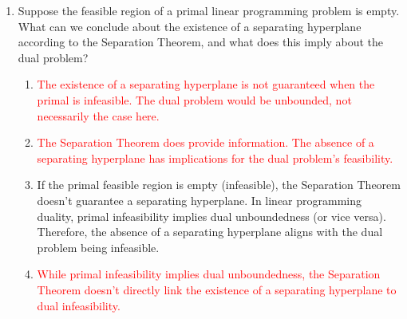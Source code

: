 \documentclass{article}%
\newcommand{\incorrect}[1]{\textcolor{red}{#1}}
\begin{document}
\begin{enumerate}
\begin{enumerate}
\item The Separation Theorem offers a geometric perspective on strong duality. It shows that if both the primal and dual problems are feasible, then there's no gap between their optimal objective function values, a key aspect of strong duality. This geometric separation argument provides an alternative proof to algebraic approaches.%
\item \incorrect{The Separation Theorem is directly relevant to duality; it's not just about the geometry of feasible regions. It's about separating a point from a convex set, which has implications for the optimal values of primal and dual problems.}%
\item \incorrect{The Separation Theorem doesn't directly address the unboundedness of either problem.  The relationship between unboundedness and infeasibility in duality is proven using other methods.}%
\item \incorrect{The optimal solutions are not separated; rather, the optimal objective function values are equal (in the case of strong duality). The theorem deals with separating a point from a convex set.}%
\end{enumerate}%
\vspace{1em}%
\item Suppose the feasible region of a primal linear programming problem is empty.  What can we conclude about the existence of a separating hyperplane according to the Separation Theorem, and what does this imply about the dual problem?%
\begin{enumerate}%
\item \incorrect{The existence of a separating hyperplane is not guaranteed when the primal is infeasible. The dual problem would be unbounded, not necessarily the case here.}%
\item \incorrect{The Separation Theorem does provide information.  The absence of a separating hyperplane has implications for the dual problem's feasibility.}%
\item If the primal feasible region is empty (infeasible), the Separation Theorem doesn't guarantee a separating hyperplane.  In linear programming duality, primal infeasibility implies dual unboundedness (or vice versa). Therefore, the absence of a separating hyperplane aligns with the dual problem being infeasible.%
\item \incorrect{While primal infeasibility implies dual unboundedness, the Separation Theorem doesn't directly link the existence of a separating hyperplane to dual infeasibility.}%

\end{enumerate}
\end{enumerate}
\end{document}
